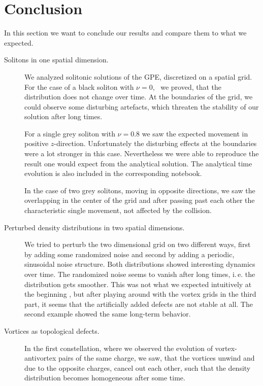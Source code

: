 \section{Conclusion}
In this section we want to conclude our results and compare them to what we expected.
\begin{description}
	\item[Solitons in one spatial dimension.] 
	
We analyzed solitonic solutions of the GPE, discretized on a spatial grid. For the case of a black soliton with $\nu=0$, \ we proved, that the distribution does not change over time. At the boundaries of the grid, we could observe some disturbing artefacts, which threaten the stability of our solution after long times.

For a single grey soliton with $\nu = 0.8$ we saw the expected movement in positive $z$-direction. Unfortunately the disturbing effects at the boundaries were a lot stronger in this case. Nevertheless we were able  to reproduce the result one would expect from the analytical solution. The analytical time evolution is also included in the corresponding notebook.
	
In the case of two grey solitons, moving in opposite directions, we saw the overlapping in the center of the grid and after passing past each other the characteristic single movement, not affected by the collision. 
	
	\item[Perturbed density distributions in two spatial dimensions.]
	
We tried to perturb the two dimensional grid on two different ways, first by adding some randomized noise and second by adding a periodic, sinusoidal noise structure. Both distributions showed interesting dynamics over time. The randomized noise seems to vanish after long times, i.\,e. the distribution gets smoother. This was not what we expected intuitively at the beginning , but after playing around with the vortex grids in the third part, it seems that the artificially added defects are not stable at all. The second example showed the same long-term behavior.
  
	\item[Vortices as topological defects.]
	
In the first constellation, where we observed the evolution of vortex-antivortex pairs of the same charge, we saw, that the vortices unwind and due to the opposite charges, cancel out each other, such that the density distribution becomes homogeneous after some time. 


\end{description}
